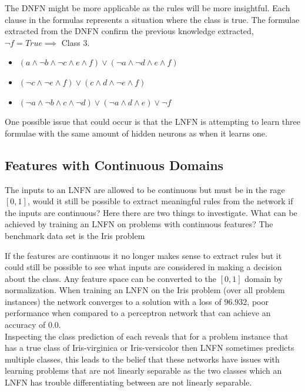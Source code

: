 The DNFN might be more applicable as the rules will be more insightful. Each clause in the formulas represents a situation where the class is true. The formulae extracted from the DNFN confirm the previous knowledge extracted, $\lnot f = True \implies $ Class 3.

\begin{itemize}
	\item {} $(a \land \lnot b \land \lnot c \land e \land f) \lor (\lnot a \land \lnot d \land e \land f)$
	\item {} $(\lnot c \land \lnot e \land f) \lor (c \land d \land \lnot e \land f)$
	\item {} $(\lnot a \land \lnot b \land c \land \lnot d) \lor (\lnot a \land d \land e) \lor \lnot f$
\end{itemize}

One possible issue that could occur is that the LNFN is attempting to learn three formulae with the same amount of hidden neurons as when it learns one.

\subsection{Features with Continuous Domains}
The inputs to an LNFN are allowed to be continuous but must be in the rage $[0, 1]$, would it still be possible to extract meaningful rules from the network if the inputs are continuous? Here there are two things to investigate. What can be achieved by training an LNFN on problems with continuous features? The benchmark data set is the Iris problem \cite{Lichman:2013}

If the features are continuous it no longer makes sense to extract rules but it could still be possible to see what inputs are considered in making a decision about the class. Any feature space can be converted to the $[0,1]$ domain by normalization. When training an LNFN on the Iris problem (over all problem instances) the network converges to a solution with a loss of $96.932$, poor performance when compared to a perceptron network that can achieve an accuracy of $0.0$. \\

Inspecting the class prediction of each reveals that for a problem instance that has a true class of Iris-virginica or Iris-versicolor then LNFN sometimes predicts multiple classes, this leads to the belief that these networks have issues with learning problems that are not linearly separable as the two classes which an LNFN has trouble differentiating between are not linearly separable.\\

